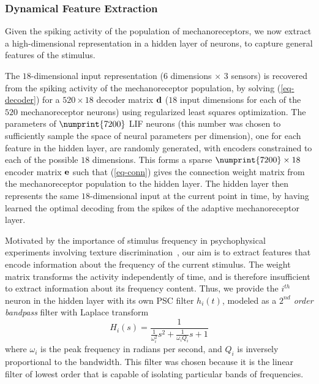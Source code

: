 \subsubsection{Dynamical Feature Extraction}

Given the spiking activity of the population of mechanoreceptors, we now extract a high-dimensional representation in a hidden layer of neurons,  to capture general features of the stimulus.

The $18$-dimensional input representation ($6$ dimensions $\times$ $3$ sensors) is recovered from the spiking activity of the mechanoreceptor population,  by solving (\ref{eq-decoder}) for a $520 \times 18$ decoder matrix $\mathbf{d}$ ($18$ input dimensions for each of the $520$ mechanoreceptor neurons)  using regularized least squares optimization. The parameters of $\numprint{7200}$ LIF neurons (this number was chosen to sufficiently sample the space of neural parameters per dimension), one for each feature in the hidden layer,  are randomly generated, with encoders constrained to each of the possible $18$ dimensions. This forms a sparse $\numprint{7200} \times 18$ encoder matrix $\mathbf{e}$ such that (\ref{eq-conn}) gives the connection weight matrix from the mechanoreceptor population to the hidden layer. %
The hidden layer then represents the same $18$-dimensional input at the current point in time, by having learned the optimal decoding from the spikes of the adaptive mechanoreceptor layer. 

Motivated by the importance of stimulus frequency in psychophysical experiments involving texture \mbox{discrimination \cite{unger2013physical}}, our aim is to extract features that encode information about the frequency of the current stimulus.  The weight matrix transforms the activity independently of time, and is therefore insufficient to extract information about its frequency content. Thus, we provide the $i^{th}$ neuron in the hidden layer with its own PSC filter $h_i(t)$, modeled as a {\it $2^{nd}$ order bandpass} filter with Laplace transform
\begin{equation}
\label{eq-bandpass}
H_i(s) = \frac{1}{\frac{1}{\omega_i^2}s^2 + \frac{1}{\omega_i Q_i}s + 1}
\end{equation}
where $\omega_i$ is the peak frequency in radians per second, and $Q_i$ is inversely proportional to the bandwidth. This filter was chosen because it is the linear filter of lowest order that is capable of isolating particular bands of frequencies. 

